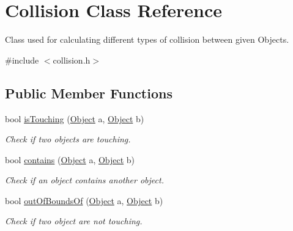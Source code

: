 \hypertarget{classCollision}{}\section{Collision Class Reference}
\label{classCollision}


Class used for calculating different types of collision between given Objects.  




{\ttfamily \#include $<$collision.\+h$>$}

\subsection*{Public Member Functions}
\begin{DoxyCompactItemize}
\item 
\mbox{\label{classCollision_ae005eb1d857f6127b2673aecacbbd03f}} 
bool \hyperlink{classCollision_ae005eb1d857f6127b2673aecacbbd03f}{is\+Touching} (\hyperlink{classObject}{Object} a, \hyperlink{classObject}{Object} b)
\begin{DoxyCompactList}\small\item\em Check if two objects are touching. \end{DoxyCompactList}\item 
\mbox{\label{classCollision_a2ccec68bed3147982c829327b4083dc6}} 
bool \hyperlink{classCollision_a2ccec68bed3147982c829327b4083dc6}{contains} (\hyperlink{classObject}{Object} a, \hyperlink{classObject}{Object} b)
\begin{DoxyCompactList}\small\item\em Check if an object contains another object. \end{DoxyCompactList}\item 
\mbox{\label{classCollision_a4fae301767751ae007e953d1d2f49e7b}} 
bool \hyperlink{classCollision_a4fae301767751ae007e953d1d2f49e7b}{out\+Of\+Bounds\+Of} (\hyperlink{classObject}{Object} a, \hyperlink{classObject}{Object} b)
\begin{DoxyCompactList}\small\item\em Check if two object are not touching. \end{DoxyCompactList}\item 
\mbox{\label{classCollision_aecbf1758ca3a93a39568dbdf87213f20}} 

\end{DoxyCompactItemize}
